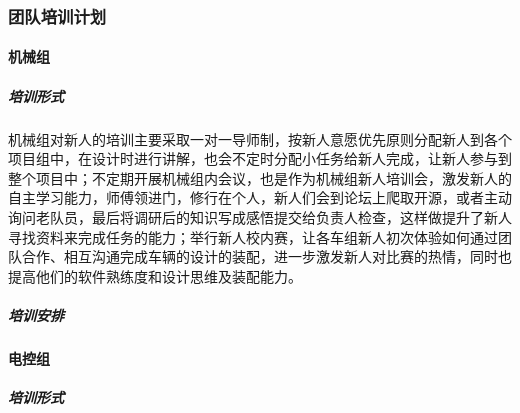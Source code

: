     \subsubsection{团队培训计划}

        \paragraph{机械组}

            \subparagraph{培训形式}

                机械组对新人的培训主要采取一对一导师制，按新人意愿优先原则分配新人到各个项目组中，在设计时进行讲解，也会不定时分配小任务给新人完成，让新人参与到整个项目中；不定期开展机械组内会议，也是作为机械组新人培训会，激发新人的自主学习能力，师傅领进门，修行在个人，新人们会到论坛上爬取开源，或者主动询问老队员，最后将调研后的知识写成感悟提交给负责人检查，这样做提升了新人寻找资料来完成任务的能力；举行新人校内赛，让各车组新人初次体验如何通过团队合作、相互沟通完成车辆的设计的装配，进一步激发新人对比赛的热情，同时也提高他们的软件熟练度和设计思维及装配能力。
  
            \subparagraph{培训安排}


        \paragraph{电控组}

            \subparagraph{培训形式}


